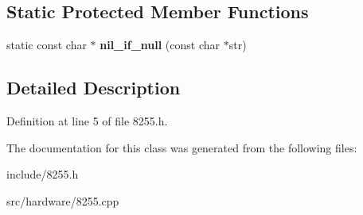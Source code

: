 \subsection*{Static Protected Member Functions}
\begin{DoxyCompactItemize}
\item 
\hypertarget{classIntel8255_a4d14f0770973a9e416acc5ac04857eb1}{static const char $\ast$ {\bfseries nil\-\_\-if\-\_\-null} (const char $\ast$str)}\label{classIntel8255_a4d14f0770973a9e416acc5ac04857eb1}

\end{DoxyCompactItemize}


\subsection{Detailed Description}


Definition at line 5 of file 8255.\-h.



The documentation for this class was generated from the following files\-:\begin{DoxyCompactItemize}
\item 
include/8255.\-h\item 
src/hardware/8255.\-cpp\end{DoxyCompactItemize}
